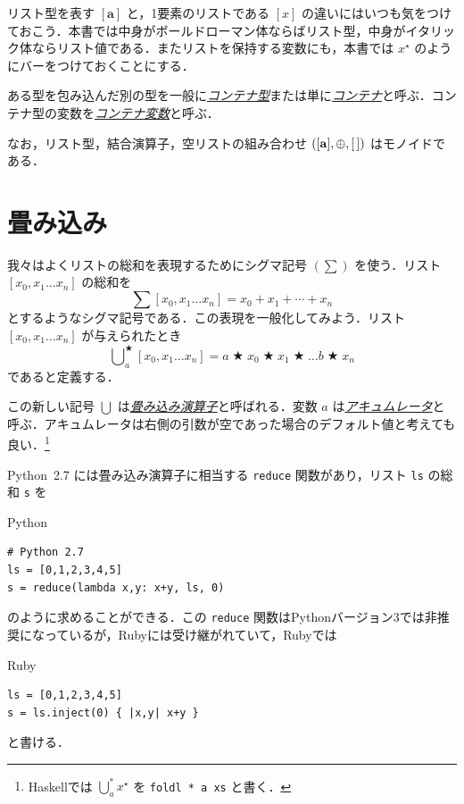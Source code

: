 \documentclass[a4paper]{jsbook}
\newcommand{\programminglanguage}[1]{\textsf{#1}}
\newcommand{\haskell}{\programminglanguage{Haskell}}
\newcommand{\python}{\programminglanguage{Python}}
\newcommand{\ruby}{\programminglanguage{Ruby}}
\newcommand{\keyword}[1]{{\underline{\emph{#1}}}}
\newcommand{\code}[1]{\texttt{#1}}
\newenvironment{pythoncode}{\begin{itembox}[r]{\python}}{\end{itembox}}
\newenvironment{rubycode}{\begin{itembox}[r]{\ruby}}{\end{itembox}}
\newcommand{\mType}[1]{\mathbf{#1}}
\newcommand{\mListType}[1]{[\mType{#1}]}
\newcommand{\mListWith}[1]{\left[#1\right]}
\newcommand{\mTupleWith}[1]{\left(#1\right)}
\newcommand{\mList}[1]{{#1}^\mathrm{\star}}
\DeclareMathOperator{\mBinOp}{\bigstar}
\DeclareMathOperator*{\mFoldLeft}{\bigcup}
\DeclareMathOperator{\mAppend}{\oplus}
\begin{document}
リスト型を表す $\mListType{a}$ と，1要素のリストである $\mListWith{x}$ の違いにはいつも気をつけておこう．本書では中身がボールドローマン体ならばリスト型，中身がイタリック体ならリスト値である．またリストを保持する変数にも，本書では $\mList{x}$ のようにバーをつけておくことにする．

ある型を包み込んだ別の型を一般に\keyword{コンテナ型}または単に\keyword{コンテナ}と呼ぶ．コンテナ型の変数を\keyword{コンテナ変数}と呼ぶ．

なお，リスト型，結合演算子，空リストの組み合わせ $\mTupleWith{\mListType{a},\mAppend,\mEmptyList}$ はモノイドである．

\section{畳み込み}

我々はよくリストの総和を表現するためにシグマ記号 $(\sum)$ を使う．リスト $\mListWith{x_0,x_1\dots x_n}$ の総和を
\begin{equation}
\sum\mListWith{x_0,x_1\dots x_n}=x_0+x_1+\dotsb+x_n
\end{equation}
とするようなシグマ記号である．この表現を一般化してみよう．リスト $\mListWith{x_0,x_1\dots x_n}$ が与えられたとき
\begin{equation}
\mFoldLeft^{\mBinOp}_{a}\mListWith{x_0,x_1\dots x_n}
=a\mBinOp x_0\mBinOp x_1\mBinOp\dots b\mBinOp x_n
\end{equation}
であると定義する．

この新しい記号 $\mFoldLeft$ は\keyword{畳み込み演算子}と呼ばれる．変数 $a$ は\keyword{アキュムレータ}と呼ぶ．アキュムレータは右側の引数が空であった場合のデフォルト値と考えても良い．\footnote{\haskell では $\mFoldLeft^{*}_a\mList{x}$ を \code{foldl * a xs} と書く．}

\python\ 2.7 には畳み込み演算子に相当する \code{reduce} 関数があり，リスト \code{ls} の総和 \code{s} を
\begin{pythoncode}
\begin{verbatim}
# Python 2.7
ls = [0,1,2,3,4,5]
s = reduce(lambda x,y: x+y, ls, 0)
\end{verbatim}
\end{pythoncode}
のように求めることができる．この \code{reduce} 関数は\python バージョン3では非推奨になっているが，\ruby には受け継がれていて，\ruby では
\begin{rubycode}
\begin{verbatim}
ls = [0,1,2,3,4,5]
s = ls.inject(0) { |x,y| x+y }
\end{verbatim}
\end{rubycode}
と書ける．
\end{document}
